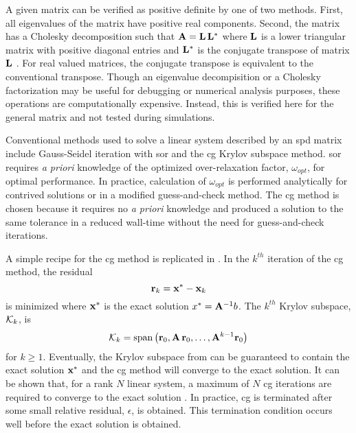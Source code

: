     A given matrix can be verified as positive definite by one of two methods.
    First, all eigenvalues of the matrix have positive real components. Second,
    the matrix has a Cholesky decomposition such that $\mathbf{A} = \mathbf{L} \, \mathbf{L}^*$ where
    $\mathbf{L}$ is a lower triangular matrix with positive diagonal entries and
    $\mathbf{L}^*$ is the conjugate transpose of matrix $\mathbf{L}$ \cite{textbookipsen}. For
    real valued matrices, the conjugate transpose is equivalent to the
    conventional transpose. Though an eigenvalue decompisition or a Cholesky
    factorization may be useful for debugging or numerical analysis purposes, 
    these operations are computationally expensive. Instead, this is verified 
    here for the general matrix and not tested during simulations.
    
    Conventional methods used to solve a linear system described by an \gls{spd}
    matrix include Gauss-Seidel iteration with \gls{sor} and the \gls{cg} Krylov 
    subspace method. \gls{sor} requires \textit{a priori} knowledge of the 
    optimized over-relaxation factor, $\omega_{opt}$, for optimal performance. 
    In practice, calculation of $\omega_{opt}$ is performed analytically for 
    contrived solutions or in a modified guess-and-check method. The \gls{cg} 
    method is chosen because it requires no \textit{a priori} knowledge and
    produced a solution to the same tolerance in a reduced wall-time without the
    need for guess-and-check iterations.  

    A simple recipe for the \gls{cg} method is replicated in
     \cite{Kelley1995IterativeEquations}. 
    In the $k^{th}$ iteration of the \gls{cg} method, the residual
    \begin{equation}
      \label{eq:cg_residual}
      \mathbf{r}_k = \mathbf{x}^* - \mathbf{x}_k
    \end{equation}
    is minimized where $\mathbf{x}^*$ is the exact solution $x^* = \mathbf{A}^{-1}b$.
    The $k^{th}$ Krylov subspace, $\mathcal{K}_k$, is 
    \begin{equation}
      \label{eq:cg_subspace}
      \mathcal{K}_k = \mathrm{span} \left( \mathbf{r}_0, \mathbf{A} \, \mathbf{r}_0, \ldots , 
        \mathbf{A}^{k-1} \mathbf{r}_0\right)
    \end{equation}
    for $k \ge 1$.
    Eventually, the Krylov subspace from  can be guaranteed
    to contain the exact solution $\mathbf{x}^*$ and the \gls{cg} method will converge
    to the exact solution. It can be shown that, for a rank $N$ linear system, a
    maximum of $N$ \gls{cg} iterations are required to converge to the exact
    solution \cite{Kelley1995IterativeEquations}. In practice, \gls{cg} is
    terminated after some small relative residual, $\epsilon$, is obtained.
    This termination condition occurs well before the exact solution is obtained.
    
